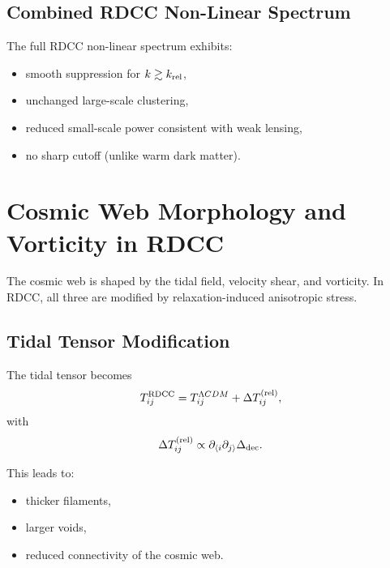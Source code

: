 \documentclass[11pt,a4paper]{article}
\begin{document}
\subsection{Combined RDCC Non-Linear Spectrum}

The full RDCC non-linear spectrum exhibits:
\begin{itemize}
\item smooth suppression for $k \gtrsim k_{\rm rel}$,
\item unchanged large-scale clustering,
\item reduced small-scale power consistent with weak lensing,
\item no sharp cutoff (unlike warm dark matter).
\end{itemize}

\section{Cosmic Web Morphology and Vorticity in RDCC}

The cosmic web is shaped by the tidal field, velocity shear, and vorticity. In RDCC, all three
are modified by relaxation-induced anisotropic stress.

\subsection{Tidal Tensor Modification}

The tidal tensor becomes
\begin{equation}
T_{ij}^{\rm RDCC}
= T_{ij}^{\Lambda CDM}
+ \Delta T_{ij}^{\rm (rel)},
\end{equation}
with
\begin{equation}
\Delta T_{ij}^{\rm (rel)}
\propto \partial_{\langle i}\partial_{j\rangle}\Delta_{\rm dec}.
\end{equation}

This leads to:
\begin{itemize}
\item thicker filaments,
\item larger voids,
\item reduced connectivity of the cosmic web.
\end{itemize}
\end{document}
